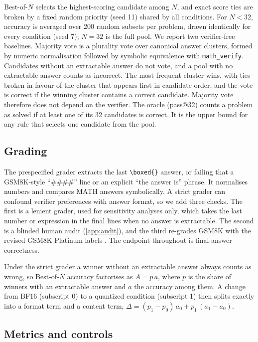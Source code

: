 Best-of-$N$ selects the highest-scoring candidate among $N$, and exact score ties are
broken by a fixed random priority (seed 11) shared by all conditions. For $N<32$,
accuracy is averaged over 200 random subsets per problem, drawn identically for every
condition (seed 7); $N=32$ is the full pool. We report two verifier-free baselines.
Majority vote is a plurality vote over canonical answer clusters, formed by numeric
normalisation followed by symbolic equivalence with \texttt{math\_verify}. Candidates
without an extractable answer do not vote, and a pool with no extractable answer counts
as incorrect. The most frequent cluster wins, with ties broken in favour of the cluster
that appears first in candidate order, and the vote is correct if the winning cluster
contains a correct candidate. Majority vote therefore does not depend on the verifier.
The oracle (pass@32) counts a problem as solved if at least one of its 32 candidates is
correct. It is the upper bound for any rule that selects one candidate from the pool.

\subsection{Grading}\label{sec:grading}

The prespecified grader extracts the last \texttt{\textbackslash boxed\{\}} answer, or
failing that a GSM8K-style ``\#\#\#\#'' line or an explicit ``the answer is'' phrase. It
normalises numbers and compares MATH answers symbolically. A strict grader can confound
verifier preferences with answer format, so we add three checks. The first is a lenient
grader, used for sensitivity analyses only, which takes the last number or expression in
the final lines when no answer is extractable. The second is a blinded human audit
(\ref{app:audit}), and the third re-grades GSM8K with the revised GSM8K-Platinum labels
\cite{vendrow2025platinum}. The endpoint throughout is final-answer correctness.

Under the strict grader a winner without an extractable answer always counts as wrong,
so Best-of-$N$ accuracy factorises as $A = p\,a$, where $p$ is the share of winners with
an extractable answer and $a$ the accuracy among them. A change from BF16 (subscript 0)
to a quantized condition (subscript 1) then splits exactly into a format term and a
content term, $\Delta = (p_1 - p_0)\,a_0 + p_1\,(a_1 - a_0)$.

\subsection{Metrics and controls}\label{sec:metrics}

